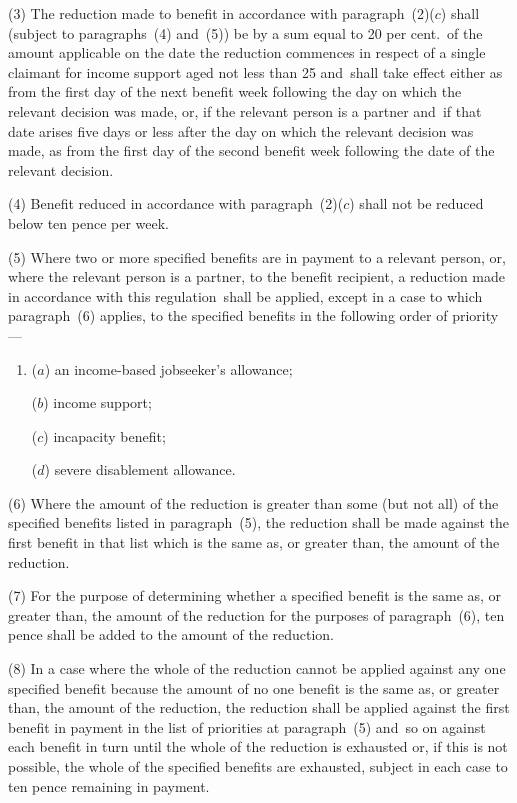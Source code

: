 \documentclass[12pt,a4paper]{article}
\begin{document}
(3) The reduction made to benefit in accordance with paragraph~(2)($c$)  shall (subject to paragraphs~(4) and~(5)) be by a sum equal to 20 per cent.\ of the amount applicable on the date the reduction commences in respect of a single claimant for income support aged not less than 25 and~shall take effect either as from the first day of the next benefit week following the day on which the relevant decision was made, or, if the relevant person is a partner and~if that date arises five days or less after the day on which the relevant decision was made, as from the first day of the second benefit week following the date of the relevant decision.

(4) Benefit reduced in accordance with paragraph~(2)($c$)  shall not be reduced below ten pence per week.

(5) Where two or more specified benefits are in payment to a relevant person, or, where the relevant person is a partner, to the benefit recipient, a reduction made in accordance with this regulation~shall be applied, except in a case to which paragraph~(6) applies, to the specified benefits in the following order of priority—
\begin{enumerate}\item[]
($a$) an income-based jobseeker’s allowance;

($b$) income support;

($c$) incapacity benefit;

($d$) severe disablement allowance.
\end{enumerate}

(6) Where the amount of the reduction is greater than some (but not all) of the specified benefits listed in paragraph~(5), the reduction shall be made against the first benefit in that list which is the same as, or greater than, the amount of the reduction.

(7) For the purpose of determining whether a specified benefit is the same as, or greater than, the amount of the reduction for the purposes of paragraph~(6), ten pence shall be added to the amount of the reduction.

(8) In a case where the whole of the reduction cannot be applied against any one specified benefit because the amount of no one benefit is the same as, or greater than, the amount of the reduction, the reduction shall be applied against the first benefit in payment in the list of priorities at paragraph~(5) and~so on against each benefit in turn until the whole of the reduction is exhausted or, if this is not possible, the whole of the specified benefits are exhausted, subject in each case to ten pence remaining in payment.
\end{document}

